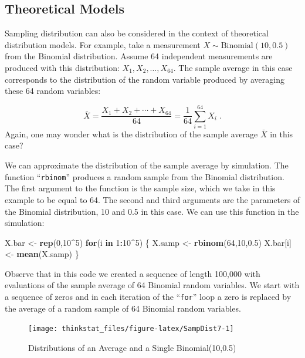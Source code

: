 \documentclass[]{krantz}
\makeatletter
\newenvironment{Shaded}{\begin{snugshade}}{\end{snugshade}}
\newcommand{\KeywordTok}[1]{\textcolor[rgb]{0.13,0.29,0.53}{\textbf{#1}}}
\newcommand{\DecValTok}[1]{\textcolor[rgb]{0.00,0.00,0.81}{#1}}
\newcommand{\FloatTok}[1]{\textcolor[rgb]{0.00,0.00,0.81}{#1}}
\newcommand{\StringTok}[1]{\textcolor[rgb]{0.31,0.60,0.02}{#1}}
\newcommand{\ControlFlowTok}[1]{\textcolor[rgb]{0.13,0.29,0.53}{\textbf{#1}}}
\newcommand{\OperatorTok}[1]{\textcolor[rgb]{0.81,0.36,0.00}{\textbf{#1}}}
\newcommand{\NormalTok}[1]{#1}
\newenvironment{kframe}{%
\medskip{}
\setlength{\fboxsep}{.8em}
 \def\at@end@of@kframe{}%
 \ifinner\ifhmode%
  \def\at@end@of@kframe{\end{minipage}}%
  \begin{minipage}{\columnwidth}%
 \fi\fi%
 \def\FrameCommand##1{\hskip\@totalleftmargin \hskip-\fboxsep
 \colorbox{shadecolor}{##1}\hskip-\fboxsep
     \hskip-\linewidth \hskip-\@totalleftmargin \hskip\columnwidth}%
 \MakeFramed {\advance\hsize-\width
   \@totalleftmargin\z@ \linewidth\hsize
   \@setminipage}}%
 {\par\unskip\endMakeFramed%
 \at@end@of@kframe}
\renewenvironment{Shaded}{\begin{kframe}}{\end{kframe}}
\theoremstyle{definition}
\theoremstyle{definition}
\theoremstyle{definition}
\theoremstyle{remark}
\makeatother
\begin{document}
\subsection{Theoretical Models}\label{subsec:theoreticalmdls}

Sampling distribution can also be considered in the context of
theoretical distribution models. For example, take a measurement
\(X \sim \mathrm{Binomial}(10,0.5)\) from the Binomial distribution.
Assume 64 independent measurements are produced with this distribution:
\(X_1, X_2, \ldots, X_{64}\). The sample average in this case
corresponds to the distribution of the random variable produced by
averaging these 64 random variables:

\[\bar X = \frac{X_1 + X_2 + \cdots + X_{64}} {64} = \frac{1}{64}\sum_{i=1}^{64} X_i\;.\]
Again, one may wonder what is the distribution of the sample average
\(\bar X\) in this case?

We can approximate the distribution of the sample average by simulation.
The function ``\texttt{rbinom}'' produces a random sample from the
Binomial distribution. The first argument to the function is the sample
size, which we take in this example to be equal to 64. The second and
third arguments are the parameters of the Binomial distribution, 10 and
0.5 in this case. We can use this function in the simulation:

\begin{Shaded}
\begin{Highlighting}[]
\NormalTok{X.bar <-}\StringTok{ }\KeywordTok{rep}\NormalTok{(}\DecValTok{0}\NormalTok{,}\DecValTok{10}\OperatorTok{^}\DecValTok{5}\NormalTok{)}
\ControlFlowTok{for}\NormalTok{(i }\ControlFlowTok{in} \DecValTok{1}\OperatorTok{:}\DecValTok{10}\OperatorTok{^}\DecValTok{5}\NormalTok{) \{}
\NormalTok{  X.samp <-}\StringTok{ }\KeywordTok{rbinom}\NormalTok{(}\DecValTok{64}\NormalTok{,}\DecValTok{10}\NormalTok{,}\FloatTok{0.5}\NormalTok{)}
\NormalTok{  X.bar[i] <-}\StringTok{ }\KeywordTok{mean}\NormalTok{(X.samp)}
\NormalTok{\}}
\end{Highlighting}
\end{Shaded}

Observe that in this code we created a sequence of length 100,000 with
evaluations of the sample average of 64 Binomial random variables. We
start with a sequence of zeros and in each iteration of the
``\texttt{for}'' loop a zero is replaced by the average of a random
sample of 64 Binomial random variables.

\begin{figure}

{\centering \texttt{[image: thinkstat\_files/figure-latex/SampDist7-1]} 

}

\caption{Distributions of an Average and a Single Binomial(10,0.5)}\label{fig:SampDist7}
\end{figure}
\end{document}

